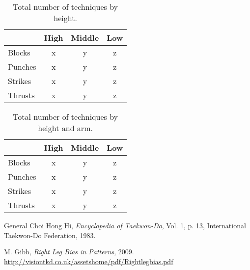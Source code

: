 \documentclass[10pt,twocolumn,a4paper]{article}
\begin{document}
\begin{table}
  \centering
  \begin{tabular}{l|c|c|c} \hline \hline
    & High & Middle & Low \\ \hline

    Blocks    & x   & y   & z \\
    Punches   & x   & y   & z \\
    Strikes   & x   & y   & z \\
    Thrusts   & x   & y   & z \\
    \hline

  \end{tabular}
  \caption{Total number of techniques by height.}
  \end{table}


\begin{table}
  \centering
  \begin{tabular}{l|c|c|c} \hline \hline
    & High & Middle & Low \\ \hline

    Blocks    & x   & y   & z \\
    Punches   & x   & y   & z \\
    Strikes   & x   & y   & z \\
    Thrusts   & x   & y   & z \\
    \hline

  \end{tabular}
  \caption{Total number of techniques by height and arm.}
  \end{table}







\begin{thebibliography}{99}
    \small  %

      General Choi Hong Hi,
      \emph{Encyclopedia of Taekwon-Do}, Vol. 1, p. 13,
      International Taekwon-Do Federation, 1983.

      M. Gibb,
      \emph{Right Leg Bias in Patterns}, 2009.
      \url{http://visiontkd.co.uk/assetshome/pdf/Rightlegbias.pdf}













\end{thebibliography}
\end{document}
